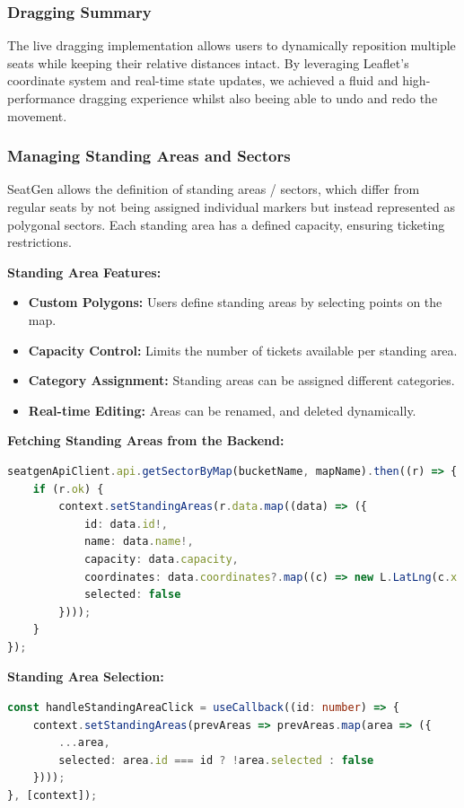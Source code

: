 \subsubsection{Dragging Summary}
The live dragging implementation allows users to dynamically reposition multiple seats while keeping their relative distances intact. By leveraging Leaflet’s coordinate system and real-time state updates, we achieved a fluid and high-performance dragging experience whilst also beeing able to undo and redo the movement.

\subsubsection{Managing Standing Areas and Sectors}

SeatGen allows the definition of standing areas / sectors, which differ from regular seats by not being assigned individual markers but instead represented as polygonal sectors. Each standing area has a defined capacity, ensuring ticketing restrictions.

\textbf{Standing Area Features:}
\begin{itemize}
    \item \textbf{Custom Polygons:} Users define standing areas by selecting points on the map.
    \item \textbf{Capacity Control:} Limits the number of tickets available per standing area.
    \item \textbf{Category Assignment:} Standing areas can be assigned different categories.
    \item \textbf{Real-time Editing:} Areas can be renamed, and deleted dynamically.
\end{itemize}

\textbf{Fetching Standing Areas from the Backend:}
\begin{lstlisting}[language=TypeScript, caption=Fetching Standing Areas, label=lst:fetch-standingareas]
seatgenApiClient.api.getSectorByMap(bucketName, mapName).then((r) => {
    if (r.ok) {
        context.setStandingAreas(r.data.map((data) => ({
            id: data.id!,
            name: data.name!,
            capacity: data.capacity,
            coordinates: data.coordinates?.map((c) => new L.LatLng(c.x!, c.y!)) ?? [],
            selected: false
        })));
    }
});
\end{lstlisting}

\textbf{Standing Area Selection:}
\begin{lstlisting}[language=TypeScript, caption=Handling Standing Area Selection, label=lst:select-standingareas]
const handleStandingAreaClick = useCallback((id: number) => {
    context.setStandingAreas(prevAreas => prevAreas.map(area => ({
        ...area,
        selected: area.id === id ? !area.selected : false
    })));
}, [context]);
\end{lstlisting}


